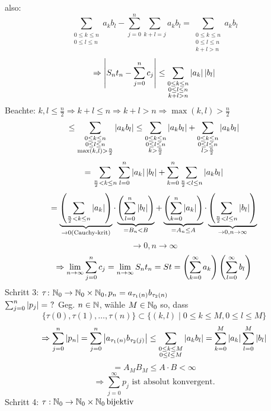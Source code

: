 \documentclass[../ana1.tex]{subfiles}
\begin{document}
\begin{bew}
    also:
    \[\sum_{\substack{0\leq k \leq n \\ 0\leq l \leq n}} a_k b_l - \sum_{j=0}^n \sum_{k+l=j} a_k b_l = \sum_{\substack{0\leq k \leq n \\ 0\leq l \leq n \\ k+l>n}} a_k b_l \]
    \[\Rightarrow \left| S_n t_n - \sum_{j=0}^n c_j \right| \leq \sum_{\substack{0\leq k\leq n \\ 0\leq l \leq n \\ k+l>n}} \left|a_k\right|\left|b_l\right|\]
    Beachte: \( k,l \leq \frac{n}{2} \Rightarrow k + l \leq n \Rightarrow k + l > n \Rightarrow \max(k,l) > \frac{n}{2} \)
    \[ \leq \sum_{\substack{0\leq k\leq n \\ 0\leq l \leq n \\ \max(k,l) > \frac{n}{2}}} \left|a_k b_l\right| \leq \sum_{\substack{0\leq k\leq n \\ 0\leq l \leq n \\ k > \frac{n}{2}}} \left|a_k b_l\right| + \sum_{\substack{0\leq k\leq n \\ 0\leq l \leq n \\ l>\frac{n}{2}}} \left|a_k b_l\right| \]
    \[ = \sum_{\frac{n}{2} < k \leq n} \sum_{l=0}^n \left|a_k\right|\left|b_l\right| + \sum_{k=0}^n \sum_{\frac{n}{2} < l \leq n} \left|a_k b_l\right| \]
    \[ = \underbrace{\left( \sum_{\frac{n}{2} < k \leq n} \left|a_k\right| \right)}_{\rightarrow 0 \text{(Cauchy-krit)}} \cdot \underbrace{\left( \sum_{l=0}^n \left|b_l\right| \right)}_{=B_n < B} + \underbrace{\left( \sum_{k=0}^n \left|a_k\right| \right)}_{=A_n \leq A} \cdot \underbrace{ \left( \sum_{\frac{n}{2} < l \leq n} \left|b_l\right| \right) }_{\rightarrow 0, n\rightarrow\infty} \]
    \[ \rightarrow 0, n\rightarrow\infty \]
    \[ \Rightarrow \lim\limits_{n\rightarrow\infty} \sum_{j=0}^n c_j = \lim\limits_{n\rightarrow\infty} S_n t_n = S t = \left( \sum_{k=0}^\infty a_k \right) \left( \sum_{l=0}^\infty b_l \right) \]
    Schritt 3: \( \tau \colon \mathbb{N}_0 \rightarrow \mathbb{N}_0 \times \mathbb{N}_0, p_n = a_{\tau_1(n)} b_{\tau_2(n)} \) \\
    \( \sum_{j=0}^n \left|p_j\right| = \ ? \)
    Geg. \(n\in\mathbb{N} \), wähle \( M\in\mathbb{N}_0 \) so, dass 
    \[ \{ \tau(0), \tau(1), \ldots, \tau(n) \} \subset \{ (k,l) \; \vert \; 0 \leq k \leq M, 0 \leq l \leq M \} \]
    \[ \Rightarrow \sum_{j=0}^n \left|p_n\right| = \sum_{j=0}^n \left|a_{\tau_1(n)} b_{\tau_2(j)}\right| \leq \sum_{\substack{0\leq k\leq M \\ 0 \leq l \leq M}} \left|a_k b_l\right| = \sum_{k=0}^M \left|a_k\right| \sum_{l=0}^M \left|b_l\right| \] 
    \[ = A_M B_M \leq A \cdot B < \infty \]
    \[ \Rightarrow \sum_{j=0}^\infty p_j \text{ ist absolut konvergent.} \]
    Schritt 4: \( \tau : \mathbb{N}_0 \rightarrow \mathbb{N}_0 \times \mathbb{N}_0 \operatorname{bijektiv} \)

\end{bew}
\end{document}
